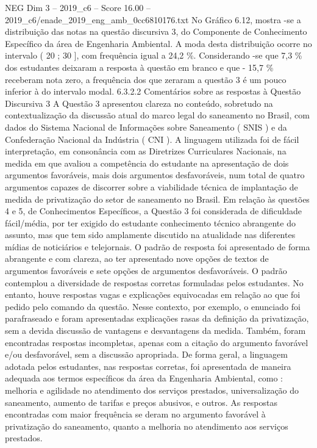 \begin{textsample}{NEG Dim 3 – 2019\_c6 – Score 16.00 – 2019\_c6/enade\_2019\_eng\_amb\_0cc6810176.txt}
No Gráfico 6.12, mostra -se a distribuição das notas na questão discursiva 3, do Componente de Conhecimento Específico da área de Engenharia Ambiental.
A moda desta distribuição ocorre no intervalo ( 20 ; 30 ], com frequência igual a 24,2 \%.
Considerando -se que 7,3 \% dos estudantes deixaram a resposta à questão em branco e que - 15,7 \% receberam nota zero, a frequência dos que zeraram a questão 3 é um pouco inferior à do intervalo modal. 6.3.2.2 Comentários sobre as respostas à Questão Discursiva 3 A Questão 3 apresentou clareza no conteúdo, sobretudo na contextualização da discussão atual do marco legal do saneamento no Brasil, com dados do Sistema Nacional de Informações sobre Saneamento ( SNIS ) e da Confederação Nacional da Indústria ( CNI ).
A linguagem utilizada foi de fácil interpretação, em consonância com as Diretrizes Curriculares Nacionais, na medida em que avaliou a competência do estudante na apresentação de dois argumentos favoráveis, mais dois argumentos desfavoráveis, num total de quatro argumentos capazes de discorrer sobre a viabilidade técnica de implantação de medida de privatização do setor de saneamento no Brasil.
Em relação às questões 4 e 5, de Conhecimentos Específicos, a Questão 3 foi considerada de dificuldade fácil/média, por ter exigido do estudante conhecimento técnico abrangente do assunto, mas que tem sido amplamente discutido na atualidade nas diferentes mídias de noticiários e telejornais.
O padrão de resposta foi apresentado de forma abrangente e com clareza, ao ter apresentado nove opções de textos de argumentos favoráveis e sete opções de argumentos desfavoráveis.
O padrão contemplou a diversidade de respostas corretas formuladas pelos estudantes.
No entanto, houve respostas vagas e explicações equivocadas em relação ao que foi pedido pelo comando da questão.
Nesse contexto, por exemplo, o enunciado foi parafraseado e foram apresentadas explicações rasas da definição da privatização, sem a devida discussão de vantagens e desvantagens da medida.
Também, foram encontradas respostas incompletas, apenas com a citação do argumento favorável e/ou desfavorável, sem a discussão apropriada.
De forma geral, a linguagem adotada pelos estudantes, nas respostas corretas, foi apresentada de maneira adequada aos termos específicos da área da Engenharia Ambiental, como : melhoria e agilidade no atendimento dos serviços prestados, universalização do saneamento, aumento de tarifas e preços abusivos, e outros.
As respostas encontradas com maior frequência se deram no argumento favorável à privatização do saneamento, quanto a melhoria no atendimento aos serviços prestados.

\end{textsample}
